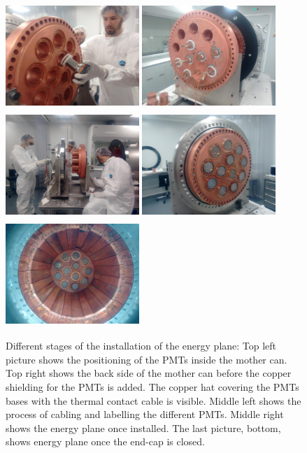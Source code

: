 \begin{figure}
  \begin{center}
    \includegraphics[height=4cm,width=0.45\textwidth]{img/Andrew_pmt.jpg}
	  \includegraphics[height=4cm,width=0.45\textwidth]{img/PMTsback}
    \includegraphics[height=4cm,width=0.45\textwidth]{img/cabling}
	 \includegraphics[height=4cm,width=0.45\textwidth]{img/full_energyplane} \\
	  \includegraphics[height=4cm,width=0.45\textwidth]{img/full_energyplane_closed}
  \end{center}
  \caption{Different stages of the installation of the energy plane: Top left picture shows the positioning of the PMTs inside the mother can. Top right shows the back side of the mother can before the copper shielding for the PMTs is added. The copper hat covering the PMTs bases with the thermal contact cable is visible. Middle left shows the process of cabling and labelling the different PMTs. Middle right shows the energy plane once installed. The last picture, bottom, shows energy plane once the end-cap is closed.}
  \label{fig:energy_installation}
\end{figure}
